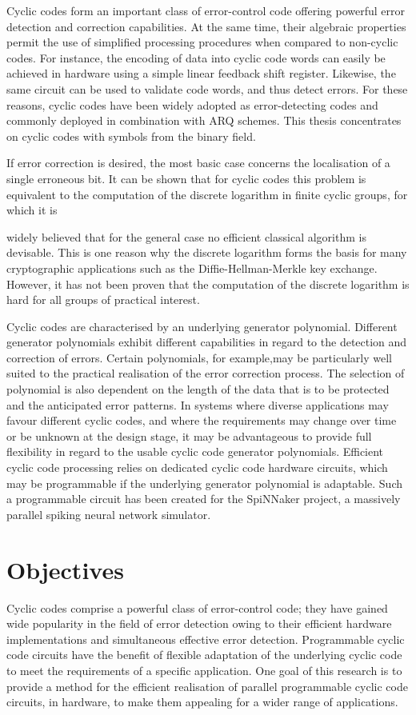 \documentclass[oneside, a4paper, 11pt]{memoir}
\begin{document}
Cyclic codes form an important class of error-control code offering powerful error detection and correction capabilities. At the same time, their algebraic properties permit the use of simplified processing procedures when compared to non-cyclic codes. For instance, the encoding of data into cyclic code words can easily be achieved in hardware using a simple linear feedback shift register. Likewise, the same circuit can be used to validate code words, and thus detect errors. For these reasons, cyclic codes have been widely adopted as error-detecting codes and commonly deployed in combination with ARQ schemes. This thesis concentrates on cyclic codes with symbols from the binary field.

If error correction is desired, the most basic case concerns the localisation of a single erroneous bit. It can be shown that for cyclic codes this problem is equivalent to the computation of the discrete logarithm in finite cyclic groups, for which it is

widely believed that for the general case no efficient classical algorithm is devisable. This is one reason why the discrete logarithm forms the basis for many cryptographic applications such as the Diffie-Hellman-Merkle key exchange. However, it has not been proven that the computation of the discrete logarithm is hard for all groups of practical interest.

Cyclic codes are characterised by an underlying generator polynomial. Different generator polynomials exhibit different capabilities in regard to the detection and correction of errors. Certain polynomials, for example,may be particularly well suited to the practical realisation of the error correction process. The selection of polynomial is also dependent on the length of the data that is to be protected and the anticipated error patterns. In systems where diverse applications may favour different cyclic codes, and where the requirements may change over time or be unknown at the design stage, it may be advantageous to provide full flexibility in regard to the usable cyclic code generator polynomials. Efficient cyclic code processing relies on dedicated cyclic code hardware circuits, which may be programmable if the underlying generator polynomial is adaptable. Such a programmable circuit has been created for the SpiNNaker project, a massively parallel spiking neural network simulator.

\section{Objectives}
Cyclic codes comprise a powerful class of error-control code; they have gained wide popularity in the field of error detection owing to their efficient hardware implementations and simultaneous effective error detection. Programmable cyclic code circuits have the benefit of flexible adaptation of the underlying cyclic code to meet the requirements of a specific application. One goal of this research is to provide a method for the efficient realisation of parallel programmable cyclic code circuits, in hardware, to make them appealing for a wider range of applications.
\end{document}
